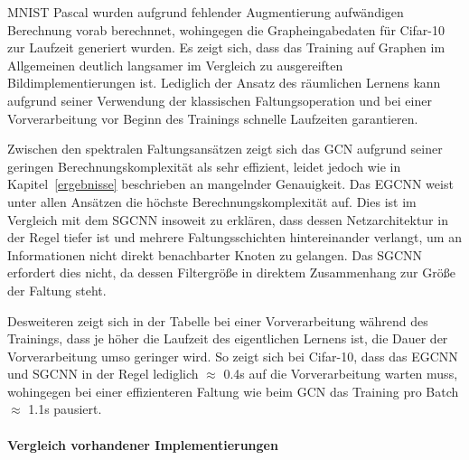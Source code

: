 \gls{MNIST} \bzw{} \gls{Pascal} wurden aufgrund fehlender Augmentierung \bzw{} aufwändigen Berechnung vorab berechnnet, wohingegen die Grapheingabedaten für \gls{Cifar}-10 zur Laufzeit generiert wurden.
Es zeigt sich, dass das Training auf Graphen im Allgemeinen deutlich langsamer im Vergleich zu ausgereiften Bildimplementierungen ist.
Lediglich der Ansatz des räumlichen Lernens kann aufgrund seiner Verwendung der klassischen Faltungsoperation und bei einer Vorverarbeitung vor Beginn des Trainings schnelle Laufzeiten garantieren.

Zwischen den spektralen Faltungsansätzen zeigt sich das \acs{GCN} aufgrund seiner geringen Berechnungskomplexität als sehr effizient, leidet jedoch wie in Kapitel~\ref{ergebnisse} beschrieben an mangelnder Genauigkeit.
Das \acs{EGCNN} weist unter allen Ansätzen die höchste Berechnungskomplexität auf.
Dies ist im Vergleich mit dem \acs{SGCNN} insoweit zu erklären, dass dessen Netzarchitektur in der Regel tiefer ist und mehrere Faltungsschichten hintereinander verlangt, um an Informationen nicht direkt benachbarter Knoten zu gelangen.
Das \acs{SGCNN} erfordert dies nicht, da dessen Filtergröße in direktem Zusammenhang zur Größe der Faltung steht.

Desweiteren zeigt sich in der Tabelle bei einer Vorverarbeitung während des Trainings, dass je höher die Laufzeit des eigentlichen Lernens ist, die Dauer der Vorverarbeitung umso geringer wird.
So zeigt sich \bspw{} bei \gls{Cifar}-10, dass das \acs{EGCNN} und \acs{SGCNN} in der Regel lediglich $\approx$ 0.4s auf die Vorverarbeitung warten muss, wohingegen bei einer effizienteren Faltung wie beim \acs{GCN} das Training pro Batch $\approx$ 1.1s pausiert.

\paragraph{Vergleich \bzgl{} vorhandener Implementierungen}
\label{vergleich_laufzeit}


